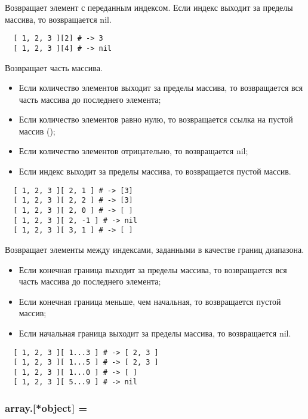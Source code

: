 \begin{methodlist}
  Возвращает элемент с переданным индексом. Если индекс выходит за пределы массива, то возвращается nil.
  \begin{verbatim}
  [ 1, 2, 3 ][2] # -> 3 
  [ 1, 2, 3 ][4] # -> nil
  \end{verbatim}

  Возвращает часть массива.
  \begin{itemize}
    \item Если количество элементов выходит за пределы массива, то возвращается вся часть массива до последнего элемента;
    \item Если количество элементов равно нулю, то возвращается ссылка на пустой массив (\mono{[]});
    \item Если количество элементов отрицательно, то возвращается nil; 
    \item Если индекс выходит за пределы массива, то возвращается пустой массив.
  \end{itemize}
  \begin{verbatim}
  [ 1, 2, 3 ][ 2, 1 ] # -> [3] 
  [ 1, 2, 3 ][ 2, 2 ] # -> [3] 
  [ 1, 2, 3 ][ 2, 0 ] # -> [ ] 
  [ 1, 2, 3 ][ 2, -1 ] # -> nil 
  [ 1, 2, 3 ][ 3, 1 ] # -> [ ]
  \end{verbatim}  

  Возвращает элементы между индексами, заданными в качестве границ диапазона.
  \begin{itemize}
    \item Если конечная граница выходит за пределы массива, то возвращается вся часть массива до последнего элемента;
    \item Если конечная граница меньше, чем начальная, то возвращается пустой массив;
    \item Если начальная граница выходит за пределы массива, то возвращается nil. 
   \end{itemize} 
  \begin{verbatim}
  [ 1, 2, 3 ][ 1...3 ] # -> [ 2, 3 ] 
  [ 1, 2, 3 ][ 1...5 ] # -> [ 2, 3 ] 
  [ 1, 2, 3 ][ 1...0 ] # -> [ ] 
  [ 1, 2, 3 ][ 5...9 ] # -> nil
  \end{verbatim}
\end{methodlist}

\subsubsection*{array.[*object] =}

